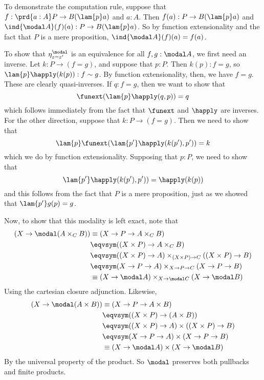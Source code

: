 To demonstrate the computation rule, suppose that $f : \prd{a:A} P \to
B(\lam{p}a)$ and $a : A$.  Then $f(a) : P \to B(\lam{p}a)$ and $\ind{\modal
A}(f)(a) : P \to B(\lam{p}a)$.  So by function extensionality and the fact that
$P$ is a mere proposition, $\ind{\modal A}(f)(a) = f(a)$.


To show that $\eta^{\modal}_{z = z'}$ is an equivalence for all $f, g : \modal
A$, we first need an inverse.  Let $k : P \to (f = g)$, and suppose that $p :
P$.  Then $k(p) : f = g$, so $\lam{p}\happly(k(p)) : f \sim g$.  By function
extensionality, then, we have $f = g$.  These are clearly quasi-inverses.  If
$q : f = g$, then we want to show that
\[
  \funext(\lam{p}\happly(q, p)) = q
\]
which follows immediately from the fact that $\funext$ and $\happly$ are
inverses.  For the other direction, suppose that $k : P \to (f = g)$.  Then we
need to show that
\[
  \lam{p}\funext(\lam{p'}\happly(k(p'), p')) = k
\]
which we do by function extensionality.  Supposing that $p : P$, we need to
show that
\[
  \lam{p'}\happly(k(p'), p')) = \happly(k(p))
\]
and this follows from the fact that $P$ is a mere proposition, just as we
showed that $\lam{p'}g(p) = g$.


Now, to show that this modality is left exact, note that
\begin{align*}
 (X \to \modal(A \times_{C} B))
 &\equiv
 (X \to P \to A \times_{C} B)
 \\&\eqvsym
 ((X \times P) \to A \times_{C} B)
 \\&\eqvsym
 ((X \times P) \to A) \times_{(X \times P) \to C} ((X \times P) \to B)
 \\&\eqvsym
 (X \to P \to A) \times_{X \to P \to C} (X \to P \to B)
 \\&\equiv
 (X \to \modal A) \times_{X \to \modal C} (X \to \modal B)
\end{align*}
Using the cartesian closure adjunction.  Likewise,
\begin{align*}
  (X \to \modal(A \times B))
  &\equiv
  (X \to P \to A \times B)
  \\&\eqvsym
  ((X \times P) \to (A \times B))
  \\&\eqvsym
  ((X \times P) \to A)
  \times
  ((X \times P) \to B)
  \\&\eqvsym
  (X \to P \to A)
  \times
  (X \to P \to B)
  \\&\equiv
  (X \to \modal A)
  \times
  (X \to \modal B)
\end{align*}
By the universal property of the product.  So $\modal$ preserves both pullbacks
and finite products.


